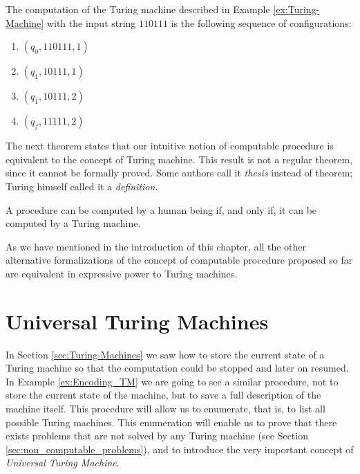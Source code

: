 \begin{example}
The computation of the Turing machine described in Example \ref{ex:Turing-Machine} with the input string $110111$ is the following sequence of configurations:

\begin{enumerate}
\item $(q_0, 110111, 1)$
\item $(q_1, 10111,  1)$
\item $(q_1, 10111,  2)$  
\item $(q_f, 11111,  2)$  
\end{enumerate}

\end{example}

The next theorem states that our intuitive notion of computable procedure is equivalent to the concept of Turing machine. This result is not a regular theorem, since it cannot be formally proved. Some authors call it \emph{thesis} instead of theorem; Turing himself called it a \emph{definition}.

\begin{theorem}
\label{th:turing_thesis}
A procedure can be computed by a human being if, and only if, it can be computed by a Turing machine.
\end{theorem}

As we have mentioned in the introduction of this chapter, all the other alternative formalizations of the concept of computable procedure proposed so far are equivalent in expressive power to Turing machines. 

%
%

\section{Universal Turing Machines}
\label{sec:Universal-Turing-Machines}

In Section \ref{sec:Turing-Machines} we saw how to store the current state of a Turing machine so that the computation could be stopped and later on resumed. In Example \ref{ex:Encoding_TM} we are going to see a similar procedure, not to store the current state of the machine, but to save a full description of the machine itself. This procedure will allow us to enumerate, that is, to list all possible Turing machines. This enumeration will enable us to prove that there exists problems that are not solved by any Turing machine (see Section \ref{sec:non_computable_problems}), and to introduce the very important concept of \emph{Universal Turing Machine}.

